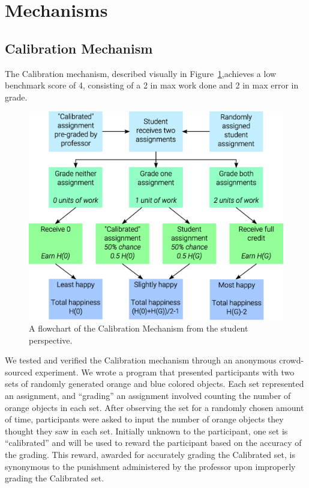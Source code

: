 \documentclass{chi-ext}
\begin{document}
\section{Mechanisms}
\subsection{Calibration Mechanism}

The Calibration mechanism, described visually in Figure~\ref{fig:calibration},achieves a low benchmark score of 4, consisting of a 2 in max work done and 2 in max error in grade.

\begin{figure}
  \centering
  \includegraphics[width=\linewidth]{Calibration-Flowchart.eps}
  \caption{A flowchart of the Calibration Mechanism from the student perspective.}
  \label{fig:calibration}
\end{figure}

We tested and verified the Calibration mechanism through an anonymous crowd-sourced experiment. We wrote a program that presented participants with two sets of randomly generated orange and blue colored objects. Each set represented an assignment, and ``grading'' an assignment involved counting the number of orange objects in each set. After observing the set for a randomly chosen amount of time, participants were asked to input the number of orange objects they thought they saw in each set. Initially unknown to the participant, one set is ``calibrated'' and will be used to reward the participant based on the accuracy of the grading. This reward, awarded for accurately grading the Calibrated set, is synonymous to the punishment administered by the professor upon improperly grading the Calibrated set.
\end{document}
